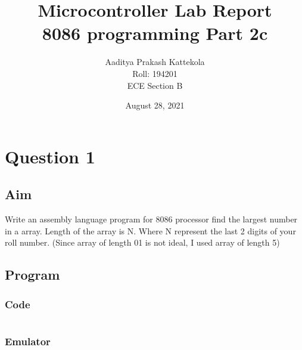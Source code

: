 \documentclass{article}
\title{
	Microcontroller Lab Report \\
\large 8086 programming Part 2c
} %
\author{
	Aaditya Prakash Kattekola \\
	{\small Roll: 194201} \\
	{\small ECE Section B} \\
} %
\date{August 28, 2021} %
\begin{document}
\maketitle %



\break
\section{Question 1}

\subsection{Aim}
Write an assembly language program for 8086 processor find the largest number in a array. Length of the array is N. Where N represent the last 2 digits of your roll number. 
(Since array of length 01 is not ideal, I used array of length 5)

\subsection{Program}
\subsubsection{Code}
\inputminted{nasm}{"C:/Users/aadit/Documents/BTech/5th Semester/MC Lab/8086 Pgrm 2/2C/MAX_ELEMENT.asm"}

\subsubsection{Emulator}
\end{document}
